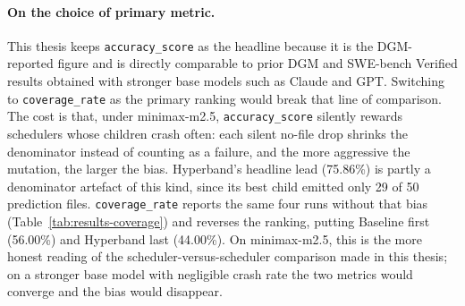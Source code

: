 \enlargethispage{\baselineskip}

\paragraph{On the choice of primary metric.}
This thesis keeps \texttt{accuracy\_score} as the headline because it
is the DGM-reported figure and is directly comparable to prior DGM and
SWE-bench Verified results obtained with stronger base models such as
Claude and GPT. Switching to \texttt{coverage\_rate} as the primary
ranking would break that line of comparison. The cost is that, under
minimax-m2.5, \texttt{accuracy\_score} silently rewards schedulers
whose children crash often: each silent no-file drop shrinks the
denominator instead of counting as a failure, and the more aggressive
the mutation, the larger the bias. Hyperband's headline lead
(75.86\%) is partly a denominator artefact of this kind, since its
best child emitted only 29 of 50 prediction files.
\texttt{coverage\_rate} reports the same four runs without that bias
(Table~\ref{tab:results-coverage}) and reverses the ranking, putting
Baseline first (56.00\%) and Hyperband last (44.00\%). On
minimax-m2.5, this is the more honest reading of the
scheduler-versus-scheduler comparison made in this thesis; on a
stronger base model with negligible crash rate the two metrics would
converge and the bias would disappear.
